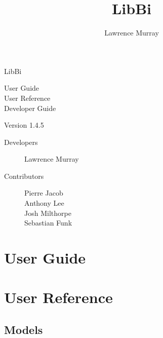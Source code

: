 \documentclass[a4paper,notitlepage]{refrep}
\title{LibBi}
\author{Lawrence Murray}
\date{}
\makeatletter
\newcommand*{\toccontents}{\@starttoc{toc}}
\makeatother
\begin{document}
\pagestyle{empty}

\begin{leftbar}

\vspace{3cm}

\fontsize{72pt}{92pt}\selectfont
LibBi

\vspace{6cm}

\fontsize{24pt}{30pt}\selectfont
User Guide \\
User Reference \\
Developer Guide

\vspace{6cm}

\fontsize{16pt}{24pt}\selectfont
Version 1.4.5

\vspace{1cm}

\end{leftbar}

\newpage
\setcounter{page}{1}
\pagestyle{plain}

{\footnotesize
\begin{description}
\item[Developers]
  Lawrence Murray
\item[Contributors]
  Pierre Jacob \\
  Anthony Lee \\
  Josh Milthorpe \\
  Sebastian Funk
\end{description}
}

\newpage
\toccontents

\newpage
\setcounter{page}{1}

\chapter{User Guide\label{User_Guide}}



\chapter{User Reference\label{User_Reference}}

\section{Models}

\end{document}
